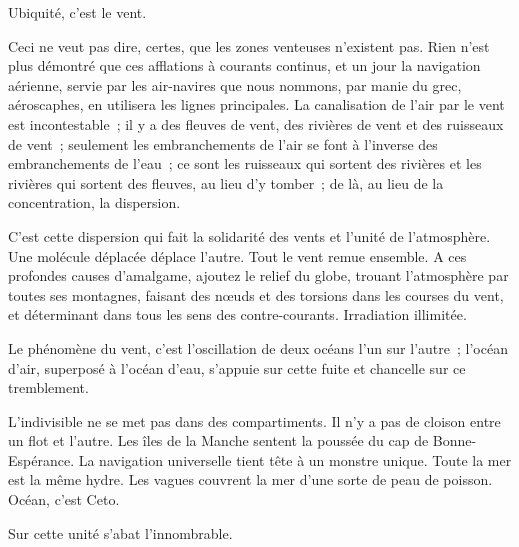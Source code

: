 \documentclass[french,twoside]{book} %
\begin{document}
Ubiquité, c’est le vent.\par
Ceci ne veut pas dire, certes, que les zones venteuses n’existent pas. Rien n’est plus démontré que ces afflations à courants continus, et un jour la navigation aérienne, servie par les air-navires que nous nommons, par manie du grec, aéroscaphes, en utilisera les lignes principales. La canalisation de l’air par le vent est incontestable ; il y a des fleuves de vent, des rivières de vent et des ruisseaux de vent ; seulement les embranchements de l’air se font à l’inverse des embranchements de l’eau ; ce sont les ruisseaux qui sortent des rivières et les rivières qui sortent des fleuves, au lieu d’y tomber ; de là, au lieu de la concentration, la dispersion.\par
C’est cette dispersion qui fait la solidarité des vents et l’unité de l’atmosphère. Une molécule déplacée  déplace l’autre. Tout le vent remue ensemble. A ces profondes causes d’amalgame, ajoutez le relief du globe, trouant l’atmosphère par toutes ses montagnes, faisant des nœuds et des torsions dans les courses du vent, et déterminant dans tous les sens des contre-courants. Irradiation illimitée.\par
Le phénomène du vent, c’est l’oscillation de deux océans l’un sur l’autre ; l’océan d’air, superposé à l’océan d’eau, s’appuie sur cette fuite et chancelle sur ce tremblement.\par
L’indivisible ne se met pas dans des compartiments. Il n’y a pas de cloison entre un flot et l’autre. Les îles de la Manche sentent la poussée du cap de Bonne-Espérance. La navigation universelle tient tête à un monstre unique. Toute la mer est la même hydre. Les vagues couvrent la mer d’une sorte de peau de poisson. Océan, c’est Ceto.\par
Sur cette unité s’abat l’innombrable.
\end{document}
